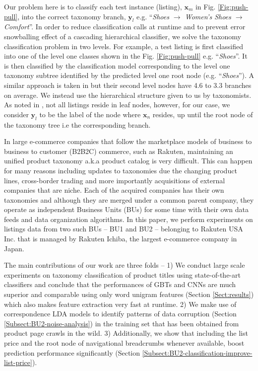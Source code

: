Our problem here is to classify each test instance (listing), $\bm{x}_m$ in Fig. \ref{Fig:push-pull}, into the correct taxonomy branch, $\bm{y}_l$ e.g. ``\textit{Shoes $\rightarrow$ Women's Shoes $\rightarrow$ Comfort}''.
In order to reduce classification calls at runtime and to prevent error snowballing effect of a cascading hierarchical classifier, we solve the taxonomy classification problem in two levels.
For example, a test listing is first classified into one of the level one classes shown in the Fig. \ref{Fig:push-pull} e.g. ``\textit{Shoes}''.
It is then classified by the classification model corresponding to the level one taxonomy subtree identified by the predicted level one root node (e.g. ``\textit{Shoes}'').
A similar approach is taken in \cite{Shen12} but their second level nodes have 4.6 to 3.3 branches on average.
We instead use the hierarchical structure given to us by taxonomists.
As noted in \cite{Julian15}, not all listings reside in leaf nodes, however, for our case, we consider $\bm{y}_l$ to be the label of the node where $\bm{x}_n$ resides, up until the root node of the taxonomy tree i.e the corresponding branch.

In large e-commerce companies that follow the marketplace models of business to business to customer (B2B2C) commerce, such as Rakuten, maintaining an unified product taxonomy a.k.a product catalog is very difficult. 
This can happen for many reasons including updates to taxonomies due the changing product lines, cross-border trading and more importantly acquisitions of external companies that are niche.
Each of the acquired companies has their own taxonomies and although they are merged under a common parent company, they operate as independent Business Units (BUs)  for some time with their own data feeds and data organization algorithms.
In this paper, we perform experiments on listings data from two such BUs -- BU1 and BU2 -- belonging to Rakuten USA Inc.
that is managed by Rakuten Ichiba, the largest e-commerce company in Japan.

The main contributions of our work are three folds -- 
1) We conduct large scale experiments on taxonomy classification of product titles using state-of-the-art classifiers and conclude that the performances of GBTs and CNNs are much superior and comparable using only word unigram features (Section \ref{Sect:results}) which also makes feature extraction very fast at runtime. 
2) We make use of correspondence LDA models to identify patterns of data corruption (Section \ref{Subsect:BU2-noise-analysis}) in the training set that has been obtained from product page crawls in the wild. 
3) Additionally, we show that including the list price and the root node of navigational breadcrumbs whenever available, boost prediction performance significantly (Section \ref{Subsect:BU2-classification-improve-list-price}).


